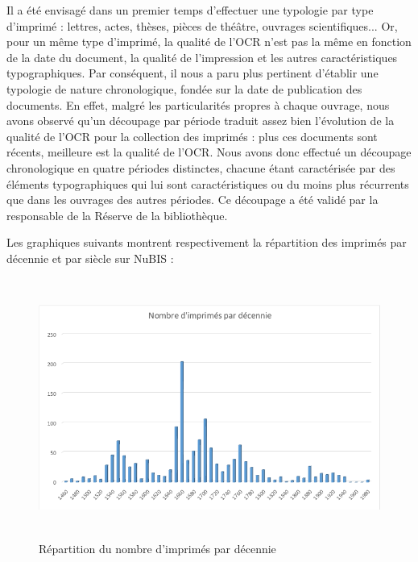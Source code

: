 \documentclass[a4paper,12pt,twoside]{book}
\begin{document}
Il a été envisagé dans un premier temps d'effectuer une typologie par
type d'imprimé : lettres, actes, thèses, pièces de
théâtre, ouvrages scientifiques... Or, pour un même type
d'imprimé, la qualité de l'OCR
n'est pas la même en fonction de la date du document, la
qualité de l'impression et les autres caractéristiques
typographiques. Par conséquent, il nous a paru plus pertinent d'établir
une typologie de nature chronologique, fondée sur la date de publication
des documents. En effet, malgré les particularités propres à chaque
ouvrage, nous avons observé qu'un découpage par période traduit assez
bien l'évolution de la qualité de l'OCR pour la collection des imprimés
: plus ces documents sont récents, meilleure est la qualité de l'OCR.
Nous avons donc effectué un découpage chronologique en quatre périodes
distinctes, chacune étant caractérisée par des éléments typographiques
qui lui sont caractéristiques ou du moins plus récurrents que dans les
ouvrages des autres périodes. Ce découpage a été validé par la
responsable de la Réserve de la bibliothèque. 

Les graphiques suivants montrent respectivement la répartition des
imprimés par décennie et par siècle sur NuBIS : \\

\begin{figure} [H]

\includegraphics[width=5.82431in,height=3.34861in]{vertopal_157ae480aa4a4b07be198b586a812241/media/image4.png}

\caption{Répartition du nombre d'imprimés par décennie}

\end{figure}
\end{document}
